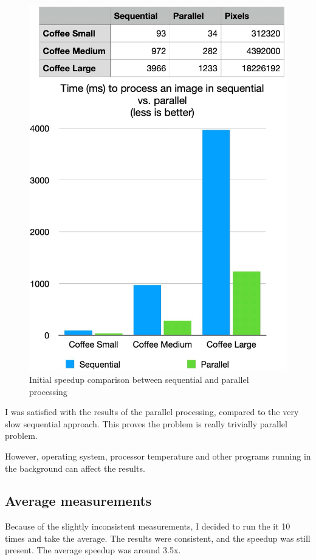 \documentclass{article}
\begin{document}
\begin{multicols}{2}
    \begin{figure}[H]
        \centering
        \includegraphics[width=\linewidth]{img/parallel_speedup.jpg}
        \caption{Initial speedup comparison between sequential and parallel processing}
        \label{fig:speedup}
    \end{figure}

    I was satisfied with the results of the parallel processing, compared to the very slow sequential approach. This proves the problem is really trivially parallel problem.

    However, operating system, processor temperature and other programs running in the background can affect the results.

    \pagebreak

    \subsection{Average measurements}
    Because of the slightly inconsistent measurements, I decided to run the it 10 times and take the average. The results were consistent, and the speedup was still present. The average speedup was around 3.5x.


\end{multicols}
\end{document}
